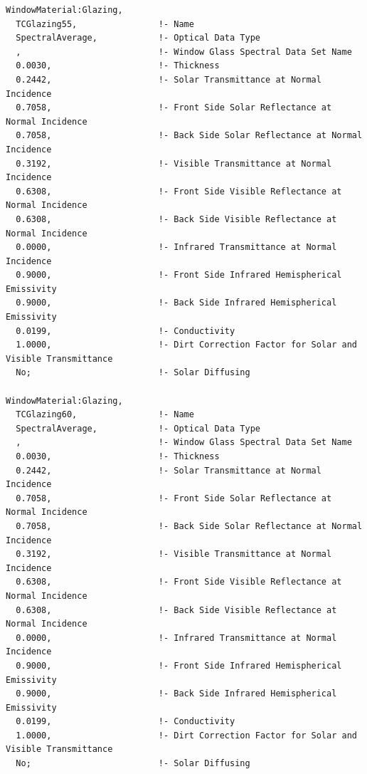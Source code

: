 \begin{lstlisting}
WindowMaterial:Glazing,
  TCGlazing55,                !- Name
  SpectralAverage,            !- Optical Data Type
  ,                           !- Window Glass Spectral Data Set Name
  0.0030,                     !- Thickness
  0.2442,                     !- Solar Transmittance at Normal Incidence
  0.7058,                     !- Front Side Solar Reflectance at Normal Incidence
  0.7058,                     !- Back Side Solar Reflectance at Normal Incidence
  0.3192,                     !- Visible Transmittance at Normal Incidence
  0.6308,                     !- Front Side Visible Reflectance at Normal Incidence
  0.6308,                     !- Back Side Visible Reflectance at Normal Incidence
  0.0000,                     !- Infrared Transmittance at Normal Incidence
  0.9000,                     !- Front Side Infrared Hemispherical Emissivity
  0.9000,                     !- Back Side Infrared Hemispherical Emissivity
  0.0199,                     !- Conductivity
  1.0000,                     !- Dirt Correction Factor for Solar and Visible Transmittance
  No;                         !- Solar Diffusing

WindowMaterial:Glazing,
  TCGlazing60,                !- Name
  SpectralAverage,            !- Optical Data Type
  ,                           !- Window Glass Spectral Data Set Name
  0.0030,                     !- Thickness
  0.2442,                     !- Solar Transmittance at Normal Incidence
  0.7058,                     !- Front Side Solar Reflectance at Normal Incidence
  0.7058,                     !- Back Side Solar Reflectance at Normal Incidence
  0.3192,                     !- Visible Transmittance at Normal Incidence
  0.6308,                     !- Front Side Visible Reflectance at Normal Incidence
  0.6308,                     !- Back Side Visible Reflectance at Normal Incidence
  0.0000,                     !- Infrared Transmittance at Normal Incidence
  0.9000,                     !- Front Side Infrared Hemispherical Emissivity
  0.9000,                     !- Back Side Infrared Hemispherical Emissivity
  0.0199,                     !- Conductivity
  1.0000,                     !- Dirt Correction Factor for Solar and Visible Transmittance
  No;                         !- Solar Diffusing


\end{lstlisting}

